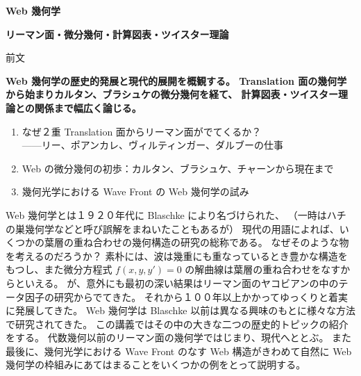 \documentclass[uplatex,dvipdfmx]{jlreq}
\begin{document}
\begin{center}
  \vspace*{20pt}
  {\Huge\bfseries Web 幾何学}

  \vspace{30pt}

  {\Large\bfseries リーマン面・微分幾何・計算図表・ツイスター理論}

  \vspace{50pt}

  {\large 前文}

  \vspace{10pt}

  \parbox{0.85\textwidth}{
    \large\bfseries
    Web 幾何学の歴史的発展と現代的展開を概観する。
    Translation 面の幾何学から始まりカルタン、ブラシュケの微分幾何を経て、
    計算図表・ツイスター理論との関係まで幅広く論じる。
  }
\end{center}

\vfill

\newpage

\noindent
{\large
\begin{enumerate}
  \setlength{\itemsep}{2pt}
  \item なぜ２重 Translation 面からリーマン面がでてくるか？\\
        \hspace*{\fill}——リー、ポアンカレ、ヴィルティンガー、ダルブーの仕事
  \item Web の微分幾何の初歩：カルタン、ブラシュケ、チャーンから現在まで
  \item 幾何光学における Wave Front の Web 幾何学の試み
\end{enumerate}
}

\bigskip
\hspace*{\fill}{\large\bfseries 中居 功（北海道大学・数学教室）}

\bigskip

Web 幾何学とは１９２０年代に Blaschke により名づけられた、
（一時はハチの巣幾何学などと呼び誤解をまねいたこともあるが）
現代の用語によれば、いくつかの葉層の重ね合わせの幾何構造の研究の総称である。
なぜそのような物を考えるのだろうか？
素朴には、波は幾重にも重なっているとき豊かな構造をもつし、また微分方程式
$f(x,y,y')=0$ の解曲線は葉層の重ね合わせをなすからといえる。
が、意外にも最初の深い結果はリーマン面のヤコビアンの中のテータ因子の研究からでてきた。
それから１００年以上かかってゆっくりと着実に発展してきた。
Web 幾何学は Blaschke 以前は異なる興味のもとに様々な方法で研究されてきた。
この講義ではその中の大きな二つの歴史的トピックの紹介をする。
代数幾何以前のリーマン面の幾何学ではじまり、現代へととぶ。
また最後に、幾何光学における Wave Front のなす Web 構造がきわめて自然に
Web 幾何学の枠組みにあてはまることをいくつかの例をとって説明する。
\end{document}

